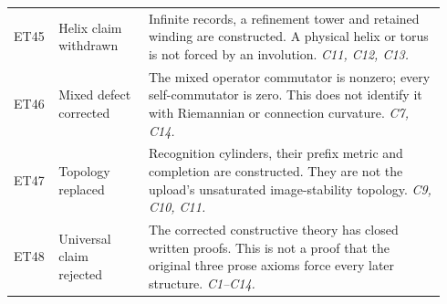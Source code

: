 \begin{longtable}{@{}>{\raggedright\arraybackslash}p{0.08\linewidth}>{\raggedright\arraybackslash}p{0.20\linewidth}>{\raggedright\arraybackslash}p{0.66\linewidth}@{}}
ET45 & Helix claim withdrawn & Infinite records, a refinement tower and retained winding are constructed. A physical helix or torus is not forced by an involution. \emph{C11, C12, C13.} \\[5pt]
ET46 & Mixed defect corrected & The mixed operator commutator is nonzero; every self-commutator is zero. This does not identify it with Riemannian or connection curvature. \emph{C7, C14.} \\[5pt]
ET47 & Topology replaced & Recognition cylinders, their prefix metric and completion are constructed. They are not the upload's unsaturated image-stability topology. \emph{C9, C10, C11.} \\[5pt]
ET48 & Universal claim rejected & The corrected constructive theory has closed written proofs. This is not a proof that the original three prose axioms force every later structure. \emph{C1--C14.} \\[5pt]
\end{longtable}
\normalsize
